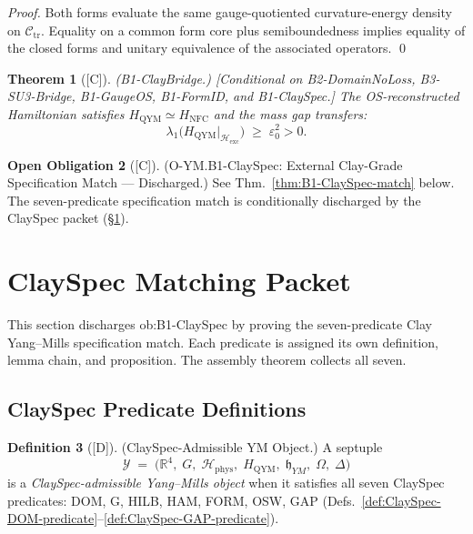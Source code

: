 \documentclass[12pt,oneside]{amsbook}
\theoremstyle{plain}
\newtheorem{theorem}{Theorem}[section]
\theoremstyle{definition}
\newtheorem{definition}[theorem]{Definition}
\newtheorem{obligation}[theorem]{Open Obligation}
\theoremstyle{remark}
\newcommand{\status}[1]{\textup{[#1]}}
\begin{document}
\begin{proof}
Both forms evaluate the same gauge-quotiented curvature-energy density
on $\mathcal{C}_{\mathrm{tr}}$. Equality on a common form core plus
semiboundedness implies equality of the closed forms and unitary
equivalence of the associated operators.
\qed
\end{proof}

\begin{theorem}[\status{C}]\label{thm:B1-ClayBridge}
\textup{(B1-ClayBridge.)}
\textup{[Conditional on B2-DomainNoLoss, B3-SU3-Bridge, B1-GaugeOS,
B1-FormID, and B1-ClaySpec.]}
The OS-reconstructed Hamiltonian satisfies
$H_{\mathrm{QYM}} \simeq H_{\mathrm{NFC}}$
and the mass gap transfers:
\[
 \lambda_1\!\bigl(H_{\mathrm{QYM}}|_{\mathcal{H}_{\mathrm{exc}}}\bigr)
 \;\ge\; \varepsilon_0^2 > 0.
\]
\end{theorem}

\begin{obligation}[\status{C}]\label{ob:B1-ClaySpec}
\textup{(O-YM.B1-ClaySpec: External Clay-Grade Specification Match --- Discharged.)}
See Thm.~\ref{thm:B1-ClaySpec-match} below. The seven-predicate
specification match is conditionally discharged by the ClaySpec packet
(§\ref{sec:ClaySpec}).
\end{obligation}

\section{ClaySpec Matching Packet}\label{sec:ClaySpec}

This section discharges ob:B1-ClaySpec by proving the seven-predicate
Clay Yang--Mills specification match. Each predicate is assigned its
own definition, lemma chain, and proposition. The assembly theorem
collects all seven.

\subsection{ClaySpec Predicate Definitions}

\begin{definition}[\status{D}]\label{def:ClaySpec-admissible-YM-object}
\textup{(ClaySpec-Admissible YM Object.)}
A septuple
\[
 \mathcal{Y} \;=\;
 \bigl(\mathbb{R}^4,\; G,\; \mathcal{H}_{\mathrm{phys}},\;
 H_{\mathrm{QYM}},\; \mathfrak{h}_{YM},\; \Omega,\; \Delta\bigr)
\]
is a \emph{ClaySpec-admissible Yang--Mills object} when it satisfies
all seven ClaySpec predicates: DOM, G, HILB, HAM, FORM, OSW, GAP
(Defs.~\ref{def:ClaySpec-DOM-predicate}--\ref{def:ClaySpec-GAP-predicate}).
\end{definition}
\end{document}
